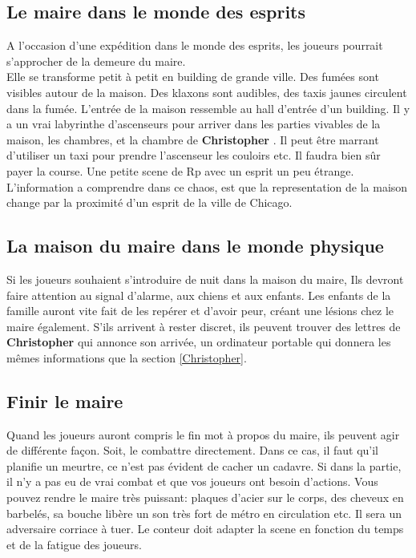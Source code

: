 \documentclass[oneside,12pt]{book}
\newcommand{\Christopher}{\textbf{Christopher} }
\begin{document}
\begin{flushleft}
\subsection{Le maire dans le monde des esprits}
A l'occasion d'une expédition dans le monde des esprits, les joueurs pourrait s'approcher de la demeure du maire. \\
Elle se transforme petit à petit en building de grande ville. Des fumées sont visibles autour de la maison. Des klaxons sont audibles, des taxis jaunes circulent dans la fumée. 
L'entrée de la maison ressemble au hall d'entrée d'un building. Il y a un vrai labyrinthe d’ascenseurs pour arriver dans les parties vivables de la maison, les chambres, et la chambre de \Christopher. Il peut être marrant d'utiliser un taxi pour prendre l'ascenseur les couloirs etc. Il faudra bien sûr payer la course. Une petite scene de Rp avec un esprit un peu étrange. \\
L'information a comprendre dans ce chaos, est que la representation de la maison change par la proximité d'un esprit de la ville de Chicago. 

\subsection{La maison du maire dans le monde physique}
Si les joueurs souhaient s'introduire de nuit dans la maison du maire, Ils devront faire attention au signal d'alarme, aux chiens et aux enfants. Les enfants de la famille auront vite fait de les repérer et d'avoir peur, créant une lésions chez le maire également. S'ils arrivent à rester discret, ils peuvent trouver des lettres de \Christopher qui annonce son arrivée, un ordinateur portable qui donnera les mêmes informations que la section \ref{Christopher}.

\subsection{Finir le maire}
Quand les joueurs auront compris le fin mot à propos du maire, ils peuvent agir de différente façon.
Soit, le combattre directement. Dans ce cas, il faut qu'il planifie un meurtre, ce n'est pas évident de cacher un cadavre. Si dans la partie, il n'y a pas eu de vrai combat et que vos joueurs ont besoin 
d'actions. Vous pouvez rendre le maire très puissant: plaques d'acier sur le corps, des cheveux en barbelés,  sa bouche libère un son très fort de métro en circulation etc. Il sera un adversaire corriace à 
tuer. Le conteur doit adapter la scene en fonction du temps et de la fatigue des joueurs.



\end{flushleft}
\end{document}
